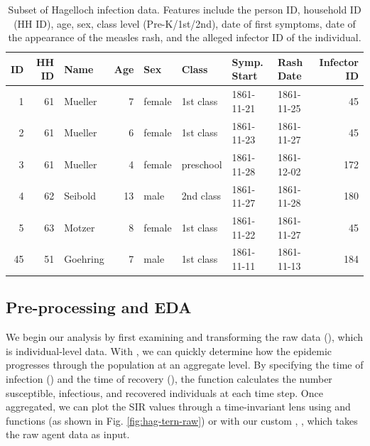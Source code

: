 \documentclass[
  shortnames]{jss}
\begin{document}
\begin{CodeChunk}
\begin{table}[!h]

\caption{\label{tab:hags-people}Subset of Hagelloch infection data.  Features include the person ID, household ID (HH ID), age, sex, class level (Pre-K/1st/2nd), date of first symptoms, date of the appearance of the measles rash, and the alleged infector ID of the individual.}
\centering
\begin{tabular}[t]{rrlrllllr}
\toprule
ID & HH ID & Name & Age & Sex & Class & Symp. Start & Rash Date & Infector ID\\
\midrule
1 & 61 & Mueller & 7 & female & 1st class & 1861-11-21 & 1861-11-25 & 45\\
2 & 61 & Mueller & 6 & female & 1st class & 1861-11-23 & 1861-11-27 & 45\\
3 & 61 & Mueller & 4 & female & preschool & 1861-11-28 & 1861-12-02 & 172\\
4 & 62 & Seibold & 13 & male & 2nd class & 1861-11-27 & 1861-11-28 & 180\\
5 & 63 & Motzer & 8 & female & 1st class & 1861-11-22 & 1861-11-27 & 45\\
45 & 51 & Goehring & 7 & male & 1st class & 1861-11-11 & 1861-11-13 & 184\\
\bottomrule
\end{tabular}
\end{table}

\end{CodeChunk}

\hypertarget{pre-processing-and-eda}{%
\subsection{Pre-processing and EDA}\label{pre-processing-and-eda}}

We begin our analysis by first examining and transforming the raw data
(), which is individual-level data. With
, we can quickly determine how the epidemic progresses
through the population at an aggregate level. By specifying the time of
infection () and the time of recovery (), the function
 calculates the number susceptible,
infectious, and recovered individuals at each time step. Once
aggregated, we can plot the SIR values through a time-invariant lens
using  and  functions (as shown in Fig.
\ref{fig:hag-tern-raw}) or with our custom ,
, which takes the raw agent data as input.
\end{document}
